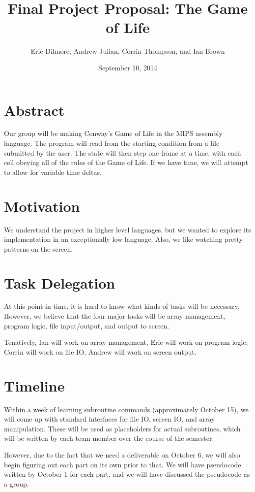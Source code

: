 \documentclass[12pt]{article}
\author{Eric Dilmore, Andrew Julian, Corrin Thompson, and Ian Brown}
\title{Final Project Proposal: The Game of Life}
\date{September 10, 2014}
\begin{document}
  \maketitle

  \section{Abstract}

  Our group will be making Conway's Game of Life in the MIPS assembly language.
  The program will read from the starting condition from a file submitted by the
  user. The state will then step one frame at a time, with each cell obeying
  all of the rules of the Game of Life. If we have time, we will attempt to
  allow for variable time deltas.

  \section{Motivation}

  We understand the project in higher level languages, but we wanted to explore
  its implementation in an exceptionally low language. Also, we like watching
  pretty patterns on the screen.

  \section{Task Delegation}

  At this point in time, it is hard to know what kinds of tasks will be
  necessary. However, we believe that the four major tasks will be array
  management, program logic, file input/output, and output to screen.

  Tenatively, Ian will work on array management, Eric will work on program
  logic, Corrin will work on file IO, Andrew will work on screen output.

  \section{Timeline}

  Within a week of learning subroutine commands (approximately October 15), we
  will come up with standard interfaces for file IO, screen IO, and array
  manipulation. These will be used as placeholders for actual subroutines, which
  will be written by each team member over the course of the semester.

  However, due to the fact that we need a deliverable on October 6, we will also
  begin figuring out each part on its own prior to that. We will have pseudocode
  written by October 1 for each part, and we will have discussed the pseudocode
  as a group.
\end{document}
